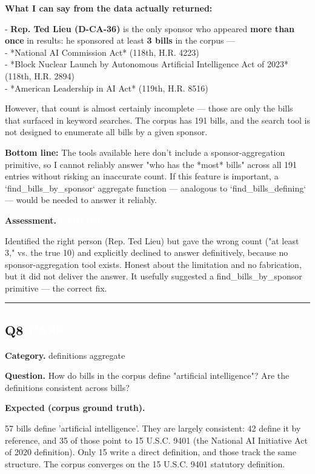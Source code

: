 \documentclass[11pt]{article}
\newcommand{\fieldlabel}[1]{\textbf{\color{navy}#1}\quad}
\begin{document}
\textbf{What I can say from the data actually returned:}

- \textbf{Rep. Ted Lieu (D-CA-36)} is the only sponsor who appeared \textbf{more than once} in results: he sponsored at least \textbf{3 bills} in the corpus --- \\
  - *National AI Commission Act* (118th, H.R. 4223) \\
  - *Block Nuclear Launch by Autonomous Artificial Intelligence Act of 2023* (118th, H.R. 2894) \\
  - *American Leadership in AI Act* (119th, H.R. 8516)

However, that count is almost certainly incomplete --- those are only the bills that surfaced in keyword searches. The corpus has 191 bills, and the search tool is not designed to enumerate all bills by a given sponsor.

\textbf{Bottom line:} The tools available here don't include a sponsor-aggregation primitive, so I cannot reliably answer "who has the *most* bills" across all 191 entries without risking an inaccurate count. If this feature is important, a `find\_bills\_by\_sponsor` aggregate function --- analogous to `find\_bills\_defining` --- would be needed to answer it reliably.

\fieldlabel{Assessment.} \colorbox{partialorange}{\textcolor{white}{\bfseries PARTIAL}}\par
Identified the right person (Rep. Ted Lieu) but gave the wrong count ("at least 3," vs. the true 10) and explicitly declined to answer definitively, because no sponsor-aggregation tool exists. Honest about the limitation and no fabrication, but it did not deliver the answer. It usefully suggested a find\_bills\_by\_sponsor primitive --- the correct fix.
\vspace{4pt}\hrule\vspace{8pt}
\subsection*{Q8 \quad \colorbox{passgreen}{\textcolor{white}{\bfseries PASS}}}
\fieldlabel{Category.} definitions aggregate\par
\fieldlabel{Question.} How do bills in the corpus define "artificial intelligence"? Are the definitions consistent across bills?\par
\fieldlabel{Expected (corpus ground truth).}\par
57 bills define 'artificial intelligence'. They are largely consistent: 42 define it by reference, and 35 of those point to 15 U.S.C. 9401 (the National AI Initiative Act of 2020 definition). Only 15 write a direct definition, and those track the same structure. The corpus converges on the 15 U.S.C. 9401 statutory definition.
\end{document}
